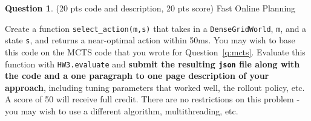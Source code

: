 \documentclass{article}
\theoremstyle{definition}
\newtheorem{question}[thm]{Question}
\begin{document}
\begin{question}
    (20 pts code and description, 20 pts score) Fast Online Planning
    
Create a function \texttt{select\_action(m,s)} that takes in a \texttt{DenseGridWorld}, \texttt{m}, and a state \texttt{s}, and returns a near-optimal action within 50ms. You may wish to base this code on the MCTS code that you wrote for Question~\ref{q:mcts}. Evaluate this function with \texttt{HW3.evaluate} and \textbf{submit the resulting \texttt{json} file along with the code and a one paragraph to one page description of your approach}, including tuning parameters that worked well, the rollout policy, etc. A score of 50 will receive full credit. There are no restrictions on this problem - you may wish to use a different algorithm, multithreading, etc.
\end{question}
\end{document}

